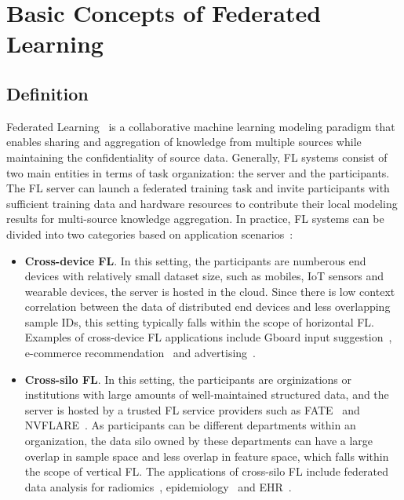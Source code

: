 \section{Basic Concepts of Federated Learning}
\label{sec:basic}
\subsection{Definition}
\label{sec:basicdefinition}
Federated Learning~\cite{IEEEstd3652, mcmahan2017communication} is a collaborative machine learning modeling paradigm that enables sharing and aggregation of knowledge from multiple sources while maintaining the confidentiality of source data.
Generally, FL systems consist of two main entities in terms of task organization: the server and the participants. 
The FL server can launch a federated training task and invite participants with sufficient training data and hardware resources to contribute their local modeling results for multi-source knowledge aggregation.
In practice, FL systems can be divided into two categories based on application scenarios~\cite{kairouz2021advances}:
\begin{itemize}
    \item \textbf{Cross-device FL}. In this setting, the participants are numberous end devices with relatively small dataset size, such as mobiles, IoT sensors and wearable devices, the server is hosted in the cloud. Since there is low context correlation between the data of distributed end devices and less overlapping sample IDs, this setting typically falls within the scope of horizontal FL. Examples of cross-device FL applications include Gboard input suggestion~\cite{hard2018federated,ramaswamy2019federated,yang2018applied}, e-commerce recommendation~\cite{niu2020billion} and advertising~\cite{wang2023flint}.
    
    \item \textbf{Cross-silo FL}. In this setting, the participants are orginizations or institutions with large amounts of well-maintained structured data, and the server is hosted by a trusted FL service providers such as FATE~\cite{liu2021fate} and NVFLARE~\cite{roth2022nvidia}. As participants can be different departments within an organization, the data silo owned by these departments can have a large overlap in sample space and less overlap in feature space, which falls within the scope of vertical FL. The applications of cross-silo FL include federated data analysis for radiomics~\cite{li2019privacy, li2020multi, scherer2020joint}, epidemiology~\cite{dayan2021federated} and EHR~\cite{brisimi2018federated, huang2019patient}.
\end{itemize}

